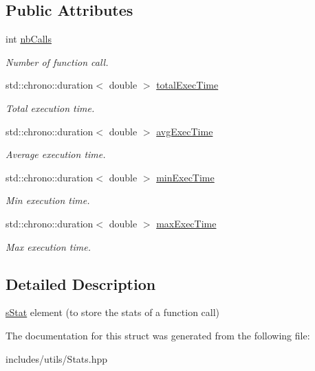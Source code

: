 \subsection*{Public Attributes}
\begin{DoxyCompactItemize}
\item 
\mbox{\label{structs_stat_aef5f9aaaa368798624425cc7ae1533f3}} 
int \hyperlink{structs_stat_aef5f9aaaa368798624425cc7ae1533f3}{nb\+Calls}
\begin{DoxyCompactList}\small\item\em Number of function call. \end{DoxyCompactList}\item 
\mbox{\label{structs_stat_a9377f7f41dc4ad1c3304072e9e5bee76}} 
std\+::chrono\+::duration$<$ double $>$ \hyperlink{structs_stat_a9377f7f41dc4ad1c3304072e9e5bee76}{total\+Exec\+Time}
\begin{DoxyCompactList}\small\item\em Total execution time. \end{DoxyCompactList}\item 
\mbox{\label{structs_stat_ac049800a0470870995a6755deaee41bb}} 
std\+::chrono\+::duration$<$ double $>$ \hyperlink{structs_stat_ac049800a0470870995a6755deaee41bb}{avg\+Exec\+Time}
\begin{DoxyCompactList}\small\item\em Average execution time. \end{DoxyCompactList}\item 
\mbox{\label{structs_stat_a0e82289a4c93accb3e7dfa2adf170c1f}} 
std\+::chrono\+::duration$<$ double $>$ \hyperlink{structs_stat_a0e82289a4c93accb3e7dfa2adf170c1f}{min\+Exec\+Time}
\begin{DoxyCompactList}\small\item\em Min execution time. \end{DoxyCompactList}\item 
\mbox{\label{structs_stat_a8fe13cb87af32ba7c292869af047dad2}} 
std\+::chrono\+::duration$<$ double $>$ \hyperlink{structs_stat_a8fe13cb87af32ba7c292869af047dad2}{max\+Exec\+Time}
\begin{DoxyCompactList}\small\item\em Max execution time. \end{DoxyCompactList}\end{DoxyCompactItemize}


\subsection{Detailed Description}
\hyperlink{structs_stat}{s\+Stat} element (to store the stats of a function call) 

The documentation for this struct was generated from the following file\+:\begin{DoxyCompactItemize}
\item 
includes/utils/Stats.\+hpp\end{DoxyCompactItemize}
